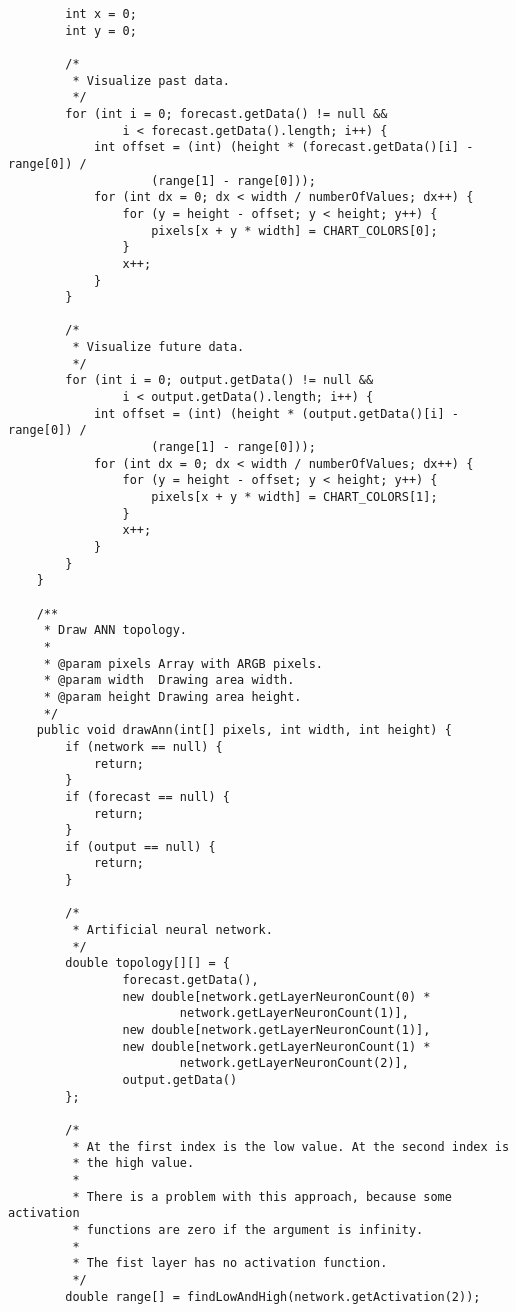 \begin{verbatim}
        int x = 0;
        int y = 0;

        /*
         * Visualize past data.
         */
        for (int i = 0; forecast.getData() != null &&
                i < forecast.getData().length; i++) {
            int offset = (int) (height * (forecast.getData()[i] - range[0]) /
                    (range[1] - range[0]));
            for (int dx = 0; dx < width / numberOfValues; dx++) {
                for (y = height - offset; y < height; y++) {
                    pixels[x + y * width] = CHART_COLORS[0];
                }
                x++;
            }
        }

        /*
         * Visualize future data.
         */
        for (int i = 0; output.getData() != null &&
                i < output.getData().length; i++) {
            int offset = (int) (height * (output.getData()[i] - range[0]) /
                    (range[1] - range[0]));
            for (int dx = 0; dx < width / numberOfValues; dx++) {
                for (y = height - offset; y < height; y++) {
                    pixels[x + y * width] = CHART_COLORS[1];
                }
                x++;
            }
        }
    }

    /**
     * Draw ANN topology.
     *
     * @param pixels Array with ARGB pixels.
     * @param width  Drawing area width.
     * @param height Drawing area height.
     */
    public void drawAnn(int[] pixels, int width, int height) {
        if (network == null) {
            return;
        }
        if (forecast == null) {
            return;
        }
        if (output == null) {
            return;
        }

        /*
         * Artificial neural network.
         */
        double topology[][] = {
                forecast.getData(),
                new double[network.getLayerNeuronCount(0) *
                        network.getLayerNeuronCount(1)],
                new double[network.getLayerNeuronCount(1)],
                new double[network.getLayerNeuronCount(1) *
                        network.getLayerNeuronCount(2)],
                output.getData()
        };

        /*
         * At the first index is the low value. At the second index is
         * the high value.
         *
         * There is a problem with this approach, because some activation
         * functions are zero if the argument is infinity.
         *
         * The fist layer has no activation function.
         */
        double range[] = findLowAndHigh(network.getActivation(2));


\end{verbatim}
